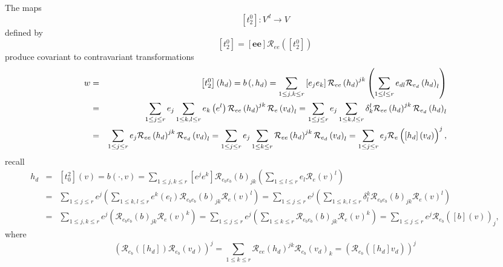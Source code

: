 \documentclass[aps,preprint]{revtex4}
\begin{document}
The maps 
\begin{equation}
\left[ t_{2}^{0}\right] :V^{d}\rightarrow V
\end{equation}%
defined by 
\begin{equation}
\left[ t_{2}^{0}\right] =\left[ \boldsymbol{ee}\right] \mathcal{R}%
_{ee}\left( \left[ t_{2}^{0}\right] \right)
\end{equation}%
produce covariant to contravariant transformations 
\begin{eqnarray}
w &=&\left[ t_{2}^{0}\right] \left( h_{d}\right) =b\left( ,h_{d}\right)
=\sum_{1\leq j,k\leq r}\left[ e_{j}e_{k}\right] \mathcal{R}_{ee}\left(
h_{d}\right) ^{jk}\left( \sum_{1\leq l\leq r}e_{dl}\mathcal{R}_{e_{d}}\left(
h_{d}\right) _{l}\right) \\
&=&\sum_{1\leq j\leq r}e_{j}\sum_{1\leq k,l\leq r}e_{k}\left( e^{l}\right) 
\mathcal{R}_{ee}\left( h_{d}\right) ^{jk}\mathcal{R}_{e}\left( v_{d}\right)
_{l}=\sum_{1\leq j\leq r}e_{j}\sum_{1\leq k,l\leq r}\delta _{k}^{l}\mathcal{R%
}_{ee}\left( h_{d}\right) ^{jk}\mathcal{R}_{e_{d}}\left( h_{d}\right) _{l} \\
&=&\sum_{1\leq j\leq r}e_{j}\mathcal{R}_{ee}\left( h_{d}\right) ^{jk}%
\mathcal{R}_{e_{d}}\left( v_{d}\right) _{l}=\sum_{1\leq j\leq
r}e_{j}\sum_{1\leq k\leq r}\mathcal{R}_{ee}\left( h_{d}\right) ^{jk}\mathcal{%
R}_{e_{d}}\left( v_{d}\right) _{l}=\sum_{1\leq j\leq r}e_{j}\mathcal{R}%
_{e}\left( \overset{}{\left[ h_{d}\right] \left( v_{d}\right) }\right) ^{j},
\end{eqnarray}%
recall%
\begin{eqnarray}
h_{d} &=&\left[ t_{0}^{2}\right] \left( v\right) =b\left( \cdot ,v\right)
=\sum_{1\leq j,k\leq r}\left[ e^{j}e^{k}\right] \mathcal{R}%
_{e_{b}e_{b}}\left( b\right) _{jk}\left( \sum_{1\leq l\leq r}e_{l}\mathcal{R}%
_{e}\left( v\right) ^{l}\right) \\
&=&\sum_{1\leq j\leq r}e^{j}\left( \sum_{1\leq k,l\leq r}e^{k}\left(
e_{l}\right) \mathcal{R}_{e_{b}e_{b}}\left( b\right) _{jk}\mathcal{R}%
_{e}\left( v\right) ^{l}\right) =\sum_{1\leq j\leq r}e^{j}\left( \sum_{1\leq
k,l\leq r}\delta _{l}^{k}\mathcal{R}_{e_{b}e_{b}}\left( b\right) _{jk}%
\mathcal{R}_{e}\left( v\right) ^{l}\right) \\
&=&\sum_{1\leq j,k\leq r}e^{j}\left( \mathcal{R}_{e_{b}e_{b}}\left( b\right)
_{jk}\mathcal{R}_{e}\left( v\right) ^{k}\right) =\sum_{1\leq j\leq
r}e^{j}\left( \sum_{1\leq k\leq r}\mathcal{R}_{e_{b}e_{b}}\left( b\right)
_{jk}\mathcal{R}_{e}\left( v\right) ^{k}\right) =\sum_{1\leq j\leq r}e^{j}%
\mathcal{R}_{e_{b}}\left( \overset{}{\left[ b\right] \left( v\right) }%
\right) _{j},
\end{eqnarray}%
where 
\begin{equation}
\left( \overset{}{\mathcal{R}_{e_{b}}\left( \left[ h_{d}\right] \right) 
\mathcal{R}_{e_{b}}\left( v_{d}\right) }\right) ^{j}=\sum_{1\leq k\leq r}%
\mathcal{R}_{ee}\left( h_{d}\right) ^{jk}\mathcal{R}_{e_{b}}\left(
v_{d}\right) _{k}=\left( \mathcal{R}_{e_{b}}\left( \overset{}{\left[ h_{d}%
\right] v_{d}}\right) \right) ^{j}
\end{equation}
\end{document}
